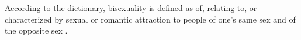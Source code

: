 According to the dictionary, bisexuality is defined as of, relating to, or 
characterized by sexual or romantic attraction to people of one's same sex and 
of the opposite sex \cite{bisexual-def}.

